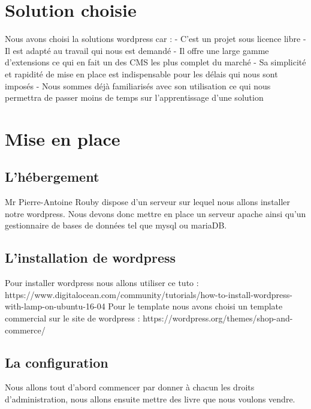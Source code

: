 \documentclass[a4paper,12pt]{report}
\begin{document}
\chapter{Solution choisie}

Nous avons choisi la solutions wordpress car : - C'est un projet sous
licence libre - Il est adapté au travail qui nous est demandé - Il
offre une large gamme d’extensions ce qui en fait un des CMS les plus
complet du marché - Sa simplicité et rapidité de mise en place est
indispensable pour les délais qui nous sont imposés - Nous sommes déjà
familiarisés avec son utilisation ce qui nous permettra de passer
moins de temps sur l'apprentissage d'une solution

\chapter{Mise en place}
\section{L'hébergement}
Mr Pierre-Antoine Rouby dispose d'un serveur sur lequel nous allons
installer notre wordpress. Nous devons donc mettre en place un serveur
apache ainsi qu'un gestionnaire de bases de données tel que mysql ou
mariaDB.

\section{L'installation de wordpress}
Pour installer wordpress nous allons utiliser ce tuto :
https://www.digitalocean.com/community/tutorials/how-to-install-wordpress-with-lamp-on-ubuntu-16-04
Pour le template nous avons choisi un template commercial sur le site
de wordpress : https://wordpress.org/themes/shop-and-commerce/

\section{La configuration}
Nous allons tout d'abord commencer par donner à chacun les droits
d'administration, nous allons ensuite mettre des livre que nous
voulons vendre.
\end{document}
